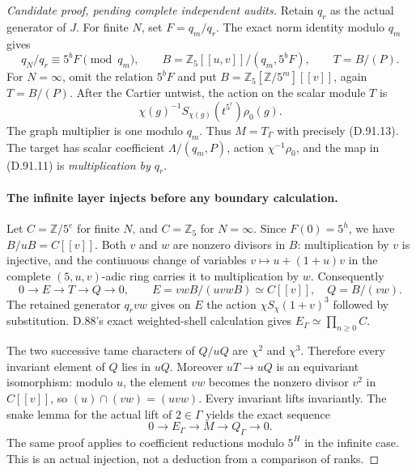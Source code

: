 \begin{proof}[Candidate proof, pending complete independent audits]
Retain \(q_r\) as the actual generator of \(J\).
For finite \(N\), set \(F=q_m/q_r\). The exact norm
identity modulo \(q_m\) gives
\[
 q_N/q_r\equiv5^b F\pmod{q_m},\qquad
 B=\mathbb Z_5[[u,v]]/(q_m,5^bF),\qquad T=B/(P).
                                                               \tag{D.91.12}
\]
For \(N=\infty\), omit the relation \(5^bF\) and put
\(B=\mathbb Z_5[\mathbb Z/5^m][[v]]\), again \(T=B/(P)\).
After the Cartier untwist, the action on the scalar module
\(T\) is
\[
 \chi(g)^{-1}S_{\chi(g)}(t^{5^r})\rho_0(g).
                                                               \tag{D.91.13}
\]
The graph multiplier is one modulo \(q_m\). Thus
\(M=T_\Gamma\) with precisely (D.91.13). The target
has scalar coefficient \(\Lambda/(q_m,P)\), action
\(\chi^{-1}\rho_0\), and the map in (D.91.11) is
\emph{multiplication by \(q_r\)}.

\paragraph{The infinite layer injects before any boundary calculation.}
Let \(C=\mathbb Z/5^e\) for finite \(N\), and
\(C=\mathbb Z_5\) for \(N=\infty\). Since \(F(0)=5^h\),
we have \(B/uB=C[[v]]\). Both \(v\) and \(w\) are
nonzero divisors in \(B\): multiplication by \(v\) is
injective, and the continuous change of variables
\(v\mapsto u+(1+u)v\) in the complete \((5,u,v)\)-adic
ring carries it to multiplication by \(w\). Consequently
\[
 0\longrightarrow E\longrightarrow T\longrightarrow Q\longrightarrow0,
 \qquad E=vwB/(uvwB)\simeq C[[v]],\quad Q=B/(vw).
                                                               \tag{D.91.14}
\]
The retained generator \(q_rvw\) gives on \(E\) the
action \(\chi S_\chi(1+v)^3\) followed by substitution.
D.88's exact weighted-shell calculation gives
\(E_\Gamma\simeq\prod_{n\ge0}C\).

The two successive tame characters of \(Q/uQ\) are
\(\chi^2\) and \(\chi^3\). Therefore every invariant
element of \(Q\) lies in \(uQ\). Moreover
\(uT\to uQ\) is an equivariant isomorphism: modulo
\(u\), the element \(vw\) becomes the nonzero divisor
\(v^2\) in \(C[[v]]\), so \((u)\cap(vw)=(uvw)\).
Every invariant lifts invariantly. The snake lemma for
the actual lift of \(2\in\Gamma\) yields the exact sequence
\[
       0\longrightarrow E_\Gamma\longrightarrow M
                 \longrightarrow Q_\Gamma\longrightarrow0.
                                                               \tag{D.91.15}
\]
The same proof applies to coefficient reductions modulo
\(5^H\) in the infinite case. This is an actual injection,
not a deduction from a comparison of ranks.


\end{proof}
